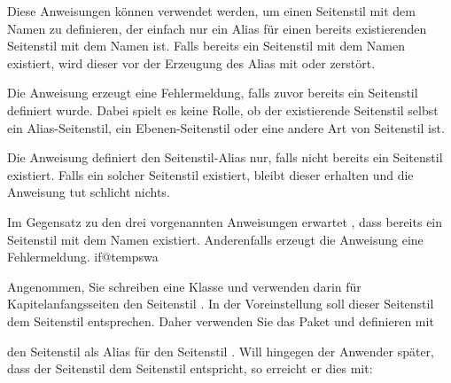 \begin{Declaration}
\end{Declaration}
%
%
Diese Anweisungen können verwendet werden, um einen Seitenstil mit dem Namen
 zu definieren, der einfach nur ein Alias für
einen bereits existierenden Seitenstil mit dem Namen  ist. Falls bereits ein Seitenstil mit dem Namen
 existiert, wird dieser vor der Erzeugung des
Alias mit  oder 
zerstört.

Die Anweisung  erzeugt eine Fehlermeldung,
falls zuvor bereits ein Seitenstil 
definiert wurde. Dabei spielt es keine Rolle, ob der existierende Seitenstil
selbst ein Alias-Seitenstil, ein Ebenen-Seitenstil oder eine andere Art von
Seitenstil ist.

Die Anweisung  definiert den Seitenstil-Alias
nur, falls nicht bereits ein Seitenstil
 existiert. Falls ein solcher Seitenstil
existiert, bleibt dieser erhalten und die Anweisung tut schlicht nichts.

Im Gegensatz zu den drei vorgenannten Anweisungen erwartet
, dass bereits ein Seitenstil mit dem Namen
 existiert. Anderenfalls erzeugt die Anweisung
eine Fehlermeldung.
%
\csname if@tempswa\endcsname%
\begin{Example}
  Angenommen, Sie schreiben eine Klasse und verwenden darin für
  Kapitelanfangsseiten den Seitenstil . In der
  Voreinstellung soll dieser Seitenstil dem Seitenstil 
  entsprechen. Daher verwenden Sie das Paket  und definieren
  mit
\begin{lstcode}
\end{lstcode}
  den Seitenstil  als Alias für den Seitenstil
  . Will hingegen der Anwender später, dass der Seitenstil
   dem Seitenstil  entspricht, so erreicht
  er dies mit:
\begin{lstcode}
\end{lstcode}%
\end{Example}%
\ExampleEndFix%
\fi
\EndIndexGroup


